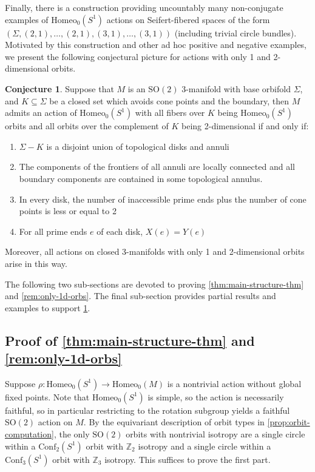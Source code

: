 \documentclass[10pt, oneside]{article}
\newcommand{\Z}{\mathbb{Z}}
\newcommand{\SO}[1][2]{\text{SO}(#1)}
\newcommand{\homeo}[1][S^1]{\text{Homeo}_0(#1)}
\newcommand{\conf}[2][S^1]{\text{Conf}_{#2}(#1)}
\theoremstyle{definition}
\newtheorem{conj}{Conjecture}[section]
\theoremstyle{definition}
\begin{document}
Finally, there is a construction providing uncountably many non-conjugate examples of $\homeo$ actions on Seifert-fibered spaces of the form $(\Sigma, (2, 1), \dots, (2, 1), (3, 1), \dots, (3, 1))$ (including trivial circle bundles). Motivated by this construction and other ad hoc positive and negative examples, we present the following conjectural picture for actions with only 1 and 2-dimensional orbits.

\begin{conj}\label{conj:one-and-two-d-orbits}
    Suppose that $M$ is an $\SO$ 3-manifold with base orbifold $\Sigma$, and $K\subseteq\Sigma$ be a closed set which avoids cone points and the boundary, then $M$ admits an action of $\homeo$ with all fibers over $K$ being $\homeo$ orbits and all orbits over the complement of $K$ being 2-dimensional if and only if:
    \begin{enumerate}
        \item $\Sigma - K$ is a disjoint union of topological disks and annuli
        \item The components of the frontiers of all annuli are locally connected and all boundary components are contained in some topological annulus.
        \item In every disk, the number of inaccessible prime ends plus the number of cone points is less or equal to 2
        \item For all prime ends $e$ of each disk, $X(e) = Y(e)$
    \end{enumerate}
    Moreover, all actions on closed 3-manifolds with only 1 and 2-dimensional orbits arise in this way.
\end{conj}

The following two sub-sections are devoted to proving \cref{thm:main-structure-thm} and \cref{rem:only-1d-orbs}. The final sub-section provides partial results and examples to support \cref{conj:one-and-two-d-orbits}.

\subsection{Proof of \texorpdfstring{\cref{thm:main-structure-thm}}{Theorem \ref*{thm:main-structure-thm}} and \texorpdfstring{\cref{rem:only-1d-orbs}}{Remark \ref*{rem:only-1d-orbs}}}
Suppose $\rho: \homeo \to \homeo[M]$ is a nontrivial action without global fixed points. Note that $\homeo$ is simple, so the action is necessarily faithful, so in particular restricting to the rotation subgroup yields a faithful $\text{SO}(2)$ action on $M$. By the equivariant description of orbit types in \cref{prop:orbit-computation}, the only $\text{SO}(2)$ orbits with nontrivial isotropy are a single circle within a $\conf[S^1]{2}$ orbit with $\Z_2$ isotropy and a single circle within a $\conf[S^1]{3}$ orbit with $\Z_3$ isotropy. This suffices to prove the first part.
\end{document}
